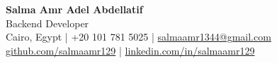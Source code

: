 \documentclass[11pt,a4paper]{article}
\begin{document}
\begin{center}
    {\Huge \textbf{Salma Amr Adel Abdellatif}} \\[4pt]
    {\large Backend Developer} \\[4pt]
    Cairo, Egypt \quad | \quad +20 101 781 5025 \quad | \quad
    \href{mailto:salmaamr1344@gmail.com}{salmaamr1344@gmail.com} \\[2pt]
    \href{https://github.com/salmaamr129}{github.com/salmaamr129} \quad | \quad
    \href{https://www.linkedin.com/in/salmaamr129/}{linkedin.com/in/salmaamr129}
\end{center}










\end{document}
